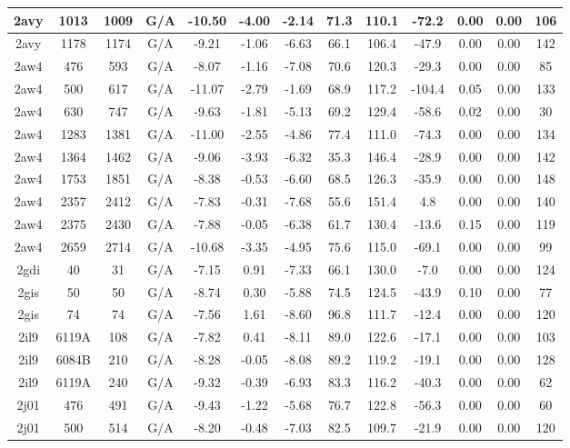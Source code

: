 {\begin{center}
\begin{longtable}{|c|c|c|c|c|c|c|c|c|c|c|c|c|}
2avy & 1013 & 1009 & G/A & -10.50 & -4.00 & -2.14 & 71.3 & 110.1 & -72.2 & 0.00 & 0.00 & 106 \\ \hline
2avy & 1178 & 1174 & G/A & -9.21 & -1.06 & -6.63 & 66.1 & 106.4 & -47.9 & 0.00 & 0.00 & 142 \\ \hline
2aw4 & 476 & 593 & G/A & -8.07 & -1.16 & -7.08 & 70.6 & 120.3 & -29.3 & 0.00 & 0.00 & 85 \\ \hline
2aw4 & 500 & 617 & G/A & -11.07 & -2.79 & -1.69 & 68.9 & 117.2 & -104.4 & 0.05 & 0.00 & 133 \\ \hline
2aw4 & 630 & 747 & G/A & -9.63 & -1.81 & -5.13 & 69.2 & 129.4 & -58.6 & 0.02 & 0.00 & 30 \\ \hline
2aw4 & 1283 & 1381 & G/A & -11.00 & -2.55 & -4.86 & 77.4 & 111.0 & -74.3 & 0.00 & 0.00 & 134 \\ \hline
2aw4 & 1364 & 1462 & G/A & -9.06 & -3.93 & -6.32 & 35.3 & 146.4 & -28.9 & 0.00 & 0.00 & 142 \\ \hline
2aw4 & 1753 & 1851 & G/A & -8.38 & -0.53 & -6.60 & 68.5 & 126.3 & -35.9 & 0.00 & 0.00 & 148 \\ \hline
2aw4 & 2357 & 2412 & G/A & -7.83 & -0.31 & -7.68 & 55.6 & 151.4 & 4.8 & 0.00 & 0.00 & 140 \\ \hline
2aw4 & 2375 & 2430 & G/A & -7.88 & -0.05 & -6.38 & 61.7 & 130.4 & -13.6 & 0.15 & 0.00 & 119 \\ \hline
2aw4 & 2659 & 2714 & G/A & -10.68 & -3.35 & -4.95 & 75.6 & 115.0 & -69.1 & 0.00 & 0.00 & 99 \\ \hline
2gdi & 40 & 31 & G/A & -7.15 & 0.91 & -7.33 & 66.1 & 130.0 & -7.0 & 0.00 & 0.00 & 124 \\ \hline
2gis & 50 & 50 & G/A & -8.74 & 0.30 & -5.88 & 74.5 & 124.5 & -43.9 & 0.10 & 0.00 & 77 \\ \hline
2gis & 74 & 74 & G/A & -7.56 & 1.61 & -8.60 & 96.8 & 111.7 & -12.4 & 0.00 & 0.00 & 120 \\ \hline
2il9 & 6119A & 108 & G/A & -7.82 & 0.41 & -8.11 & 89.0 & 122.6 & -17.1 & 0.00 & 0.00 & 103 \\ \hline
2il9 & 6084B & 210 & G/A & -8.28 & -0.05 & -8.08 & 89.2 & 119.2 & -19.1 & 0.00 & 0.00 & 128 \\ \hline
2il9 & 6119A & 240 & G/A & -9.32 & -0.39 & -6.93 & 83.3 & 116.2 & -40.3 & 0.00 & 0.00 & 62 \\ \hline
2j01 & 476 & 491 & G/A & -9.43 & -1.22 & -5.68 & 76.7 & 122.8 & -56.3 & 0.00 & 0.00 & 60 \\ \hline
2j01 & 500 & 514 & G/A & -8.20 & -0.48 & -7.03 & 82.5 & 109.7 & -21.9 & 0.00 & 0.00 & 120 \\ \hline

\end{longtable}
\end{center}}
